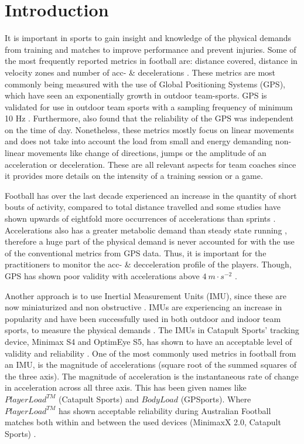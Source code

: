 \documentclass[
]{article}
\author{}
\date{\vspace{-2.5em}}
\begin{document}
\hypertarget{introduction}{%
\section{Introduction}\label{introduction}}

It is important in sports to gain insight and knowledge of the physical
demands from training and matches to improve performance and prevent
injuries. Some of the most frequently reported metrics in football are:
distance covered, distance in velocity zones and number of acc- \&
decelerations \citep{Aughey2011}. These metrics are most commonly being
measured with the use of Global Positioning Systems (GPS), which have
seen an exponentially growth in outdoor team-sports. GPS is validated
for use in outdoor team sports with a sampling frequency of minimum 10
Hz \citep{Scott2016, Johnston2014}. Furthermore, \citet{Petersen2009}
also found that the reliability of the GPS was independent on the time
of day. Nonetheless, these metrics mostly focus on linear movements and
does not take into account the load from small and energy demanding
non-linear movements like change of directions, jumps or the amplitude
of an acceleration or deceleration. These are all relevant aspects for
team coaches since it provides more details on the intensity of a
training session or a game.

Football has over the last decade experienced an increase in the
quantity of short bouts of activity, compared to total distance
travelled \citep{Barnes2014} and some studies have shown upwards of
eightfold more occurrences of accelerations than sprints
\citep{Bradley2010, Varley2012}. Accelerations also has a greater
metabolic demand than steady state running
\citep{Prampero2005, Osgnach2010, Stevens2015}, therefore a huge part of
the physical demand is never accounted for with the use of the
conventional metrics from GPS data. Thus, it is important for the
practitioners to monitor the acc- \& decceleration profile of the
players. Though, GPS has shown poor validity with accelerations above
\(4\: m\cdot s^{-2}\) \citep{Akenhead2014}.

Another approach is to use Inertial Measurement Units (IMU), since these
are now miniaturized and non obstructive \citep{Zheng2014}. IMUs are
experiencing an increase in popularity and have been successfully used
in both outdoor and indoor team sports, to measure the physical demands
\citep{GomezCarmona2020, Cust2018}. The IMUs in Catapult Sports'
tracking device, Minimax S4 and OptimEye S5, has shown to have an
acceptable level of validity and reliability
\citep{Wundersitz2015, Luteberget2018, Nicolella2018}. One of the most
commonly used metrics in football from an IMU, is the magnitude of
accelerations (square root of the summed squares of the three axis). The
magnitude of acceleration is the instantaneous rate of change in
acceleration across all three axis. This has been given names like
\(PlayerLoad^{TM}\) (Catapult Sports) and \(Body Load\) (GPSports).
Where \(PlayerLoad^{TM}\) has shown acceptable reliability during
Australian Football matches both within and between the used devices
(MinimaxX 2.0, Catapult Sports) \citep{Boyd2011}.
\end{document}
